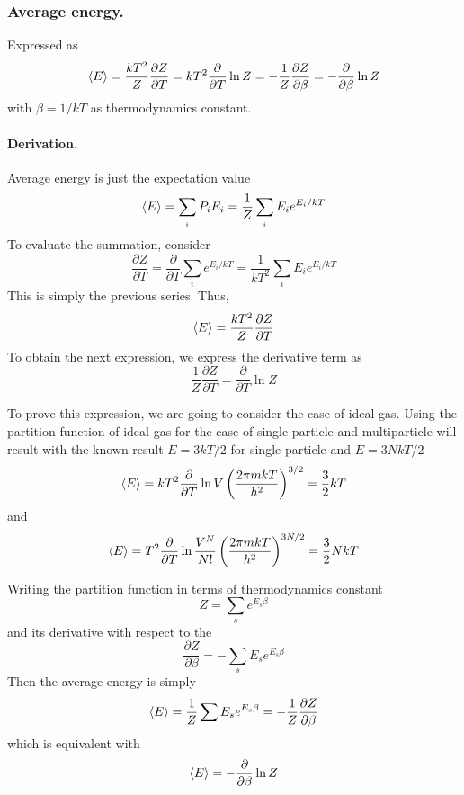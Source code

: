 \documentclass[../../../Main.tex]{subfiles}
\begin{document}
\subsubsection*{Average energy.} Expressed as
\begin{equation*}
	\braket{E}=\frac{kT^2}{Z}\frac{\partial Z}{\partial T}=kT^2\frac{\partial}{\partial T}\ln Z=-\frac{1}{Z}\frac{\partial Z}{\partial \beta}=-\frac{\partial}{\partial \beta}\ln Z
\end{equation*}
with $\beta=1/kT$ as thermodynamics constant.

\paragraph*{Derivation.} Average energy is just the expectation value
\begin{equation*}
	\braket{E}=\sum_{_i}P_iE_i=\frac{1}{Z}\sum_{_i}E_ie^{E_i/kT}
\end{equation*}
To evaluate the summation, consider
\begin{equation*}
	\frac{\partial Z}{\partial T}=\frac{\partial}{\partial T}\sum_i e^{E_i/kT}=\frac{1}{kT^2}\sum_i E_ie^{E_i/kT}
\end{equation*}
This is simply the previous series. Thus,
\begin{equation*}
	\braket{E}=\frac{kT^2}{Z}\frac{\partial Z}{\partial T}
\end{equation*}
To obtain the next expression, we express the derivative term as
\begin{equation*}
	\frac{1}{Z}\frac{\partial Z}{\partial T}=\frac{\partial }{\partial T}\ln Z
\end{equation*}

To prove this expression, we are going to consider the case of ideal gas. Using the partition function of ideal gas for the case of single particle and multiparticle will result with the known result $E=3kT/2$ for single particle and $E=3NkT/2$
\begin{equation*}
	\braket{E}=kT^2\frac{\partial}{\partial T}\ln V\left(\frac{2\pi mkT}{h^2}\right)^{3/2}=\frac{3}{2}kT
\end{equation*}
and
\begin{equation*}
	\braket{E}=T^2\frac{\partial}{\partial T}\ln \frac{V^N}{N!}\left(\frac{2\pi mkT}{h^2}\right)^{3N/2}=\frac{3}{2}NkT
\end{equation*}

Writing the partition function in terms of thermodynamics constant
\begin{equation*}
	Z=\sum_se^{E_s\beta}
\end{equation*}
and its derivative with respect to the
\begin{equation*}
	\frac{\partial Z}{\partial \beta}=-\sum_sE_se^{E_s\beta}
\end{equation*}
Then the average energy is  simply
\begin{equation*}
	\braket{E}=\frac{1}{Z}\sum E_se^{E_s\beta}=-\frac{1}{Z}\frac{\partial Z}{\partial\beta}
\end{equation*}
which is equivalent with 
\begin{equation*}
	\braket{E}=-\frac{\partial}{\partial \beta}\ln Z
\end{equation*}
\end{document}
